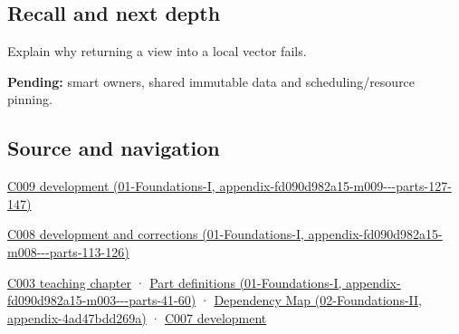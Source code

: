 \subsection{Recall and next depth}\label{appendix-d52e4486f527-recall-and-next-depth}

Explain why returning a view into a local vector fails.

\textbf{Pending:} smart owners, shared immutable data and scheduling/resource pinning.

\subsection{Source and navigation}\label{appendix-d52e4486f527-source-and-navigation}

\href{../01-Foundations-I/main.pdf\#nameddest=appendix-fd090d982a15-m009---parts-127-147}{C009 development (01-Foundations-I, appendix-fd090d982a15-m009-\/-\/-parts-127-147)}

\href{../01-Foundations-I/main.pdf\#nameddest=appendix-fd090d982a15-m008---parts-113-126}{C008 development and corrections (01-Foundations-I, appendix-fd090d982a15-m008-\/-\/-parts-113-126)}

\hyperref[05-engine-i-ch002-where-the-bytes-live]{C003 teaching chapter} · \href{../01-Foundations-I/main.pdf\#nameddest=appendix-fd090d982a15-m003---parts-41-60}{Part definitions (01-Foundations-I, appendix-fd090d982a15-m003-\/-\/-parts-41-60)} · \href{../02-Foundations-II/main.pdf\#nameddest=appendix-4ad47bdd269a}{Dependency Map (02-Foundations-II, appendix-4ad47bdd269a)} · \hyperref[05-engine-i-ch003-bringing-the-object-model-back-to-bytes]{C007 development}
